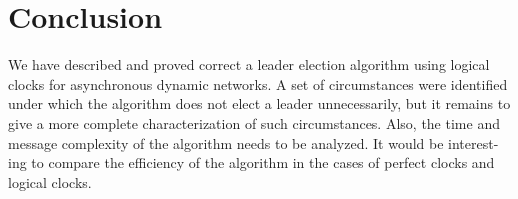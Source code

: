 \chapter{Conclusion}

We have described and proved correct a leader election
algorithm using logical clocks for asynchronous dynamic
networks. A set of circumstances were identified under
which the algorithm does not elect a leader unnecessarily,
but it remains to give a more complete characterization of
such circumstances. Also, the time and message complexity
of the algorithm needs to be analyzed. It would be interest-
ing to compare the efficiency of the algorithm in the cases
of perfect clocks and logical clocks.